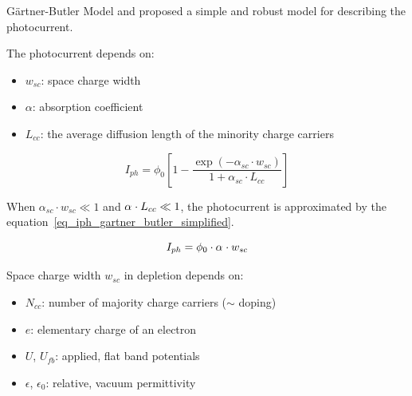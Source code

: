 \documentclass[10pt,compress,handout]{beamer}
\begin{document}
    \begin{frame}[allowframebreaks=1.0]{Gärtner-Butler Model}
        \citet{gartner1959} and \citet{butler1977} proposed a simple and robust model for 
        describing the photocurrent.
        
        The photocurrent depends on:  
            \begin{itemize}
                \item $w_{sc}$: space charge width 
                \item $\alpha$: absorption coefficient
                \item $L_{cc }$: the average diffusion length of the minority charge carriers
            \end{itemize}

        \begin{equation}
            I_{ph} = \phi _0 \left[ 1 - \frac{\exp (-\alpha _{sc} \cdot w_{sc})}{1+\alpha _{sc} \cdot
            L_{cc}} \right]
            \label{eq_iph_gartner_butler}
        \end{equation}
        
        When $\alpha _{sc} \cdot w_{sc} \ll 1$ and $\alpha _{\sc} \cdot L_{cc} \ll 1$, 
        the photocurrent is approximated by the 
        equation~\ref{eq_iph_gartner_butler_simplified}.

        \begin{equation}
            I_{ph} = \phi _0 \cdot \alpha _{\sc} \cdot w_{sc}
            \label{eq_iph_gartner_butler_simplified}
        \end{equation}
        

        \framebreak
        Space charge width $w_{sc}$ in depletion depends on:
        \begin{itemize}
            \item $N_{cc}$: number of majority charge carriers ($\sim$ doping) 
            \item $e$: elementary charge of an electron 
            \item $U$, $U_{fb}$: applied, flat band potentials
            \item $\epsilon$, $\epsilon _0$: relative, vacuum permittivity
        \end{itemize}


\end{frame}
\end{document}
